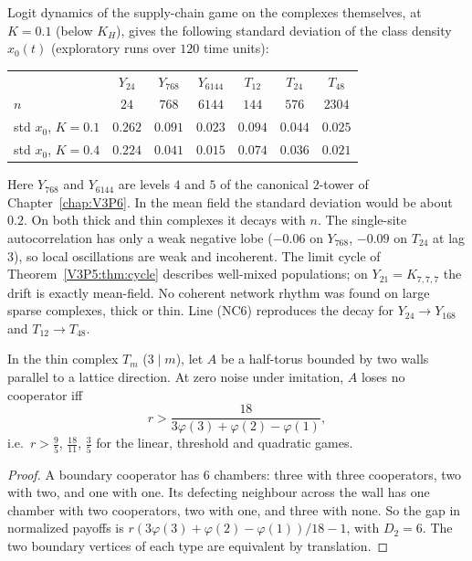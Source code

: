 \begin{remark}\label{V3P5:rem:cyclenet}
Logit dynamics of the supply-chain game on the complexes themselves, at $K=0.1$ (below $K_H$), gives
the following standard deviation of the class density $x_0(t)$ (exploratory runs over $120$ time
units):
\begin{center}
\small
\begin{tabular}{lcccccc}
\toprule
& $Y_{24}$ & $Y_{768}$ & $Y_{6144}$ & $T_{12}$ & $T_{24}$ & $T_{48}$\\
$n$ & $24$ & $768$ & $6144$ & $144$ & $576$ & $2304$\\
\midrule
std $x_0$, $K=0.1$ & $0.262$ & $0.091$ & $0.023$ & $0.094$ & $0.044$ & $0.025$\\
std $x_0$, $K=0.4$ & $0.224$ & $0.041$ & $0.015$ & $0.074$ & $0.036$ & $0.021$\\
\bottomrule
\end{tabular}
\end{center}
Here $Y_{768}$ and $Y_{6144}$ are levels $4$ and $5$ of the canonical $2$-tower of Chapter~\ref{chap:V3P6}. In the
mean field the standard deviation would be about $0.2$. On both thick and thin complexes it
decays with $n$. The single-site autocorrelation has only a weak negative lobe ($-0.06$ on
$Y_{768}$, $-0.09$ on $T_{24}$ at lag $3$), so local oscillations are weak and incoherent. The
limit cycle of Theorem~\ref{V3P5:thm:cycle} describes well-mixed populations; on $Y_{21}=K_{7,7,7}$
the drift is exactly mean-field. No coherent network rhythm was found on large sparse
complexes, thick or thin. Line (NC6) reproduces the decay for $Y_{24}\to Y_{168}$ and
$T_{12}\to T_{48}$.
\end{remark}

\begin{proposition}\label{V3P5:prop:flat}
In the thin complex $T_m$ ($3\mid m$), let $A$ be a half-torus bounded by two walls parallel to a
lattice direction. At zero noise under imitation, $A$ loses no cooperator iff
\[
r>\frac{18}{3\varphi(3)+\varphi(2)-\varphi(1)},
\]
i.e.\ $r>\frac95$, $\frac{18}{11}$, $\frac35$ for the linear, threshold and quadratic games.
\end{proposition}

\begin{proof}
A boundary cooperator has $6$ chambers: three with three cooperators, two with two, and one with
one. Its defecting neighbour across the wall has one chamber with two cooperators, two with one,
and three with none. So the gap in normalized payoffs is
$r(3\varphi(3)+\varphi(2)-\varphi(1))/18-1$, with $D_2=6$. The two boundary vertices of each type are equivalent by translation.
\end{proof}

